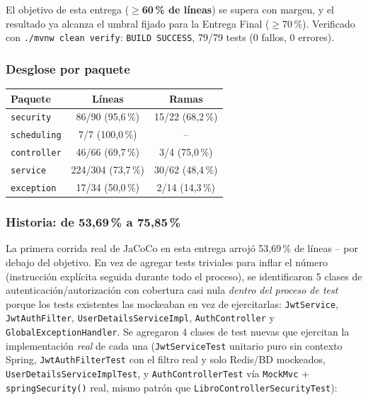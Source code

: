 \documentclass[12pt,a4paper]{article}
\begin{document}
El objetivo de esta entrega (\textbf{$\geq$60\,\% de líneas}) se supera
con margen, y el resultado ya alcanza el umbral fijado para la Entrega
Final ($\geq$70\,\%). Verificado con \texttt{./mvnw clean verify}:
\texttt{BUILD SUCCESS}, 79/79 tests (0 fallos, 0 errores).

\subsubsection*{Desglose por paquete}

\begin{center}
\begin{tabular}{|l|c|c|}
\hline
\rowcolor{verdeuteq}
\color{white}\textbf{Paquete} & \color{white}\textbf{Líneas} & \color{white}\textbf{Ramas} \\
\hline
\texttt{security} & 86/90 (95{,}6\,\%) & 15/22 (68{,}2\,\%) \\
\texttt{scheduling} & 7/7 (100{,}0\,\%) & -- \\
\texttt{controller} & 46/66 (69{,}7\,\%) & 3/4 (75{,}0\,\%) \\
\texttt{service} & 224/304 (73{,}7\,\%) & 30/62 (48{,}4\,\%) \\
\texttt{exception} & 17/34 (50{,}0\,\%) & 2/14 (14{,}3\,\%) \\
\hline
\end{tabular}
\end{center}

\subsubsection*{Historia: de 53{,}69\,\% a 75{,}85\,\%}

La primera corrida real de JaCoCo en esta entrega arrojó 53{,}69\,\% de
líneas -- por debajo del objetivo. En vez de agregar tests triviales
para inflar el número (instrucción explícita seguida durante todo el
proceso), se identificaron 5 clases de autenticación/autorización con
cobertura casi nula \emph{dentro del proceso de test} porque los tests
existentes las mockeaban en vez de ejercitarlas: \texttt{JwtService},
\texttt{JwtAuthFilter}, \texttt{UserDetailsServiceImpl},
\texttt{AuthController} y \texttt{GlobalExceptionHandler}. Se agregaron
4 clases de test nuevas que ejercitan la implementación \emph{real} de
cada una (\texttt{JwtServiceTest} unitario puro sin contexto Spring,
\texttt{JwtAuthFilterTest} con el filtro real y solo Redis/BD mockeados,
\texttt{UserDetailsServiceImplTest}, y \texttt{AuthControllerTest} vía
\texttt{MockMvc} + \texttt{springSecurity()} real, mismo patrón que
\texttt{LibroControllerSecurityTest}):
\end{document}
